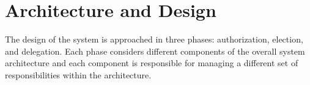 \section{Architecture and Design}\label{sec:architecture-and-design}
The design of the system is approached in three phases: authorization, election,
and delegation. Each phase considers different components of the overall system
architecture and each component is responsible for managing a different set of
responsibilities within the architecture.




\begin{center}
\end{center}








